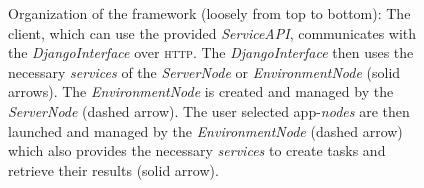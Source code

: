 \documentclass[10pt,a4paper]{article}
\begin{document}
		\begin{figure}
			\begin{center}
				
				\caption{Organization of the framework (loosely from top to bottom): The client,
				which can use the provided \emph{ServiceAPI}, communicates with the
				\emph{DjangoInterface} over \textsc{http}. The \emph{DjangoInterface} then uses the
				necessary \emph{services} of the \emph{ServerNode} or \emph{EnvironmentNode} (solid
				arrows). The \emph{EnvironmentNode} is created and managed by the \emph{ServerNode}
				(dashed arrow). The user selected app-\emph{nodes} are then launched and managed by
				the \emph{EnvironmentNode} (dashed arrow) which also provides the necessary
				\emph{services} to create tasks and retrieve their results (solid arrow).}
				\label{fig:diagram}
			\end{center}
		\end{figure}
\end{document}
